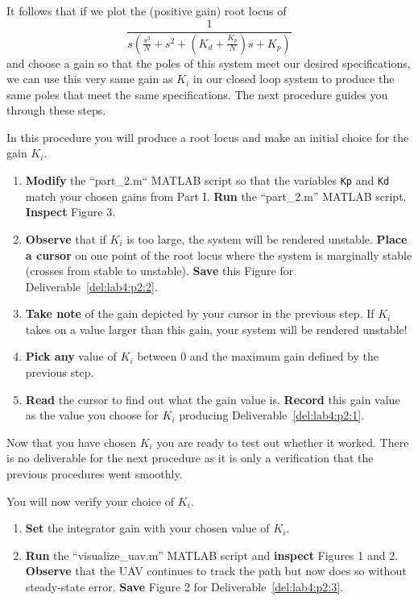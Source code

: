 It follows that if we plot the (positive gain) root locus of \[\frac{1}{s\left(\frac{s^3}{N} + s^2 + \left(K_d + \frac{K_p}{N}\right) s + K_p\right)}\] and choose a gain so that the poles of this system meet our desired specifications, we can use this very same gain as \(K_i\) in our closed loop system to produce the same poles that meet the same specifications.
The next procedure guides you through these steps.
%
\begin{procedure}[label={proc:lab4:ki}]
  In this procedure you will produce a root locus and make an initial choice for the gain \(K_i.\)
  \begin{enumerate}[label={(\arabic*)}]
    \item{%
      \textbf{Modify} the ``part\_2.m`` MATLAB script so that the variables \texttt{Kp} and \texttt{Kd} match your chosen gains from Part I.
      \textbf{Run} the ``part\_2.m'' MATLAB script.
      \textbf{Inspect} Figure 3.
    }
    \item{%
      \textbf{Observe} that if \(K_i\) is too large, the system will be rendered unstable. \textbf{Place a cursor} on one point of the root locus where the system is marginally stable (crosses from stable to unstable).
      \textbf{Save} this Figure for Deliverable~\ref{del:lab4:p2:2}.
    }
    \item{%
      \textbf{Take note} of the gain depicted by your cursor in the previous step.
      If \(K_i\) takes on a value larger than this gain, your system will be rendered unstable!
    }
    \item{%
      \textbf{Pick any} value of \(K_i\) between \(0\) and the maximum gain defined by the previous step.
    }
    \item{%
      \textbf{Read} the cursor to find out what the gain value is.
      \textbf{Record} this gain value as the value you choose for \(K_i\) producing Deliverable~\ref{del:lab4:p2:1}.
    }
  \end{enumerate}
\end{procedure}
%
Now that you have chosen \(K_i\) you are ready to test out whether it worked.
There is no deliverable for the next procedure as it is only a verification that the previous procedures went smoothly.
%
\begin{procedure}[label={proc:lab4:verify}]
  You will now verify your choice of \(K_i.\)
  \begin{enumerate}[label={(\arabic*)}]
    \item{%
      \textbf{Set} the integrator gain with your chosen value of \(K_i.\)
    }
    \item{%
      \textbf{Run} the ``visualize\_uav.m'' MATLAB script and \textbf{inspect} Figures 1 and 2.
      \textbf{Observe} that the UAV continues to track the path but now does so without steady-state error.
      \textbf{Save} Figure 2 for Deliverable~\ref{del:lab4:p2:3}.
    }
  \end{enumerate}
\end{procedure}


